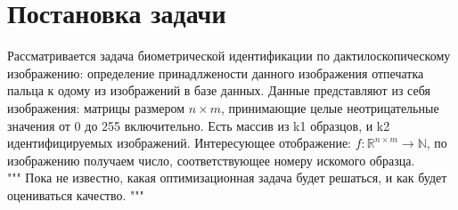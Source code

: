 \documentclass{article}
\begin{document}
\section{Постановка задачи}
Рассматривается задача биометрической идентификации по дактилоскопическому изображению: определение принадлжености данного изображения отпечатка пальца к одому из изображений в базе данных.
Данные представляют из себя изображения: матрицы размером $n \times m$, принимающие целые неотрицательные значения от 0 до 255 включительно. Есть массив из k1 образцов, и k2 идентифицируемых изображений. Интересующее отображение: $f: \mathbb{R}^{n \times m} \rightarrow \mathbb{N}$, по изображению получаем число, соответствующее номеру искомого образца. \\

"""
Пока не известно, какая оптимизационная задача будет решаться, и как будет оцениваться качество.
"""
\end{document}
